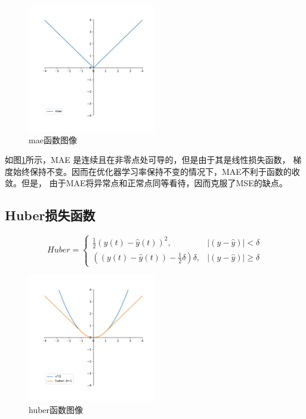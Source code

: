 \documentclass[AutoFakeBold]{LZUThesis}
\begin{document}
\begin{figure}[H]
	\centering
    \includegraphics[width=0.5\textwidth]{figures/mae.pdf}
    \caption{mae函数图像}
    \label{fig_mae}
\end{figure}

如图\ref{fig_mae}所示，MAE 是连续且在非零点处可导的，但是由于其是线性损失函数，
梯度始终保持不变。因而在优化器学习率保持不变的情况下，MAE不利于函数的收敛。但是，
由于MAE将异常点和正常点同等看待，因而克服了MSE的缺点。

\subsection{Huber损失函数}
$$
Huber=
\left\{\begin{matrix}
    \frac{1}{2}(y\left(t\right) - \hat{y}\left(t\right))^{2}, & \left | (y - \hat{y})  \right | < \delta\\
    ((y\left(t\right) - \hat{y}\left(t\right)) - \frac1 2 \delta)\delta, & \left | (y - \hat{y})  \right | \geq \delta
\end{matrix}\right.
$$

\begin{figure}[H]
	\centering
    \includegraphics[width=0.5\textwidth]{figures/huber.pdf}
    \caption{huber函数图像}
    \label{fig_huber}
\end{figure}
\end{document}

